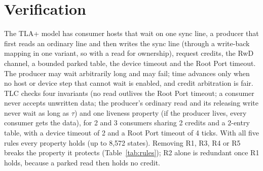 \documentclass[journal]{IEEEtran}
\begin{document}
\section{Verification}
\label{sec:verify}
The TLA+ model has consumer hosts that wait on one sync line, a producer that first reads an
ordinary line and then writes the sync line (through a write-back mapping in one variant, so with a
read for ownership), request credits, the RwD channel, a bounded parked table, the device timeout
and the Root Port timeout. The producer may wait arbitrarily long and may fail; time advances only
when no host or device step that cannot wait is enabled, and credit arbitration is fair. TLC checks
four invariants (no read outlives the Root Port timeout; a consumer never accepts unwritten data; the
producer's ordinary read and its releasing write never wait as long as $\tau$) and one liveness
property (if the producer lives, every consumer gets the data), for 2 and 3 consumers sharing 2
credits and a 2-entry table, with a device timeout of 2 and a Root Port timeout of 4 ticks. With all
five rules every property holds (up to 8,572 states). Removing R1, R3, R4 or R5 breaks the property
it protects (Table~\ref{tab:rules}); R2 alone is redundant once R1 holds, because a parked read then
holds no credit.
\end{document}
